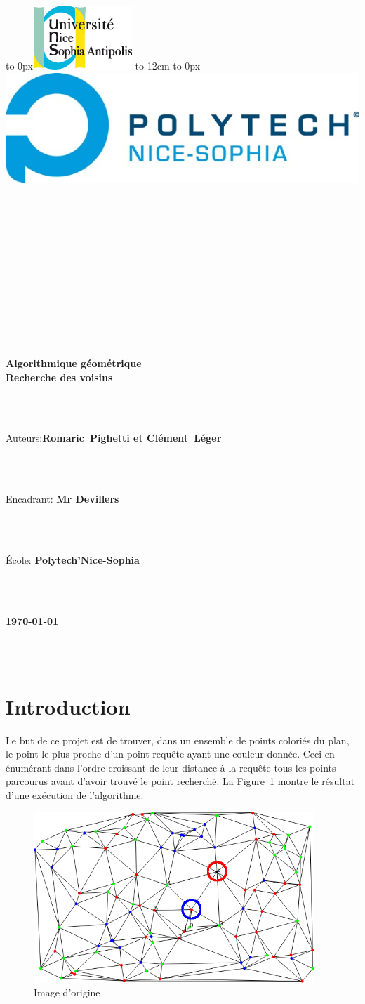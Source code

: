 \documentclass[a4paper, 11pt]{report}
\def\maketitle{
  \hspace{-2cm}
    \hbox to 0px{\includegraphics[scale = 0.7]{LOGO_UNS.png}}  
    \hbox to 12cm{}  
    \hbox to 0px{\includegraphics[scale = 1.1]{Polytech.jpg}} 
  \vfill
  \begin{center}\leavevmode
    \normalfont
    ~~\\
    ~~\\
    ~~\\
    ~~\\
    ~~\\
    ~~\\
    ~~\\
    ~~\\
    ~~\\
    ~~\\
    ~~\\
    {\LARGE \textbf{Algorithmique géométrique\\Recherche des voisins}\par}%
    ~~\\
    ~~\\
    {\Large Auteurs:\textbf{Romaric~Pighetti et Clément~Léger} \par}%
    ~~\\
    ~~\\
    {\Large Encadrant: \textbf{Mr Devillers} \par}%
    ~~\\
    ~~\\
    {\Large \'Ecole: \textbf{Polytech'Nice-Sophia} \par}%
    ~~\\
    ~~\\
    {\Large \textbf{\today}   \par}%
    ~~\\
    ~~\\
    \end{center}
  \vfill
  \null
  \clearpage
}
\begin{document}
	\addtolength{\voffset}{-2cm}
	\addtolength{\textheight}{5cm} 

  \maketitle
  
  \section*{Introduction}
  Le but de ce projet est de trouver, dans un ensemble de points coloriés du plan, le point le plus proche 
  d'un point requête ayant une couleur donnée. Ceci en énumérant dans l'ordre croissant de leur distance à la 
  requête tous les points parcourus avant d'avoir trouvé le point recherché. La Figure~\ref{exemple} montre 
  le résultat d'une exécution de l'algorithme.
  
  	\begin{figure}[!h]
	\begin{center}
	\includegraphics[width=400px]{screen.png}
	\end{center}
	\caption[]{Image d'origine}
	\label{exemple}
	\end{figure}
	
\end{document}
